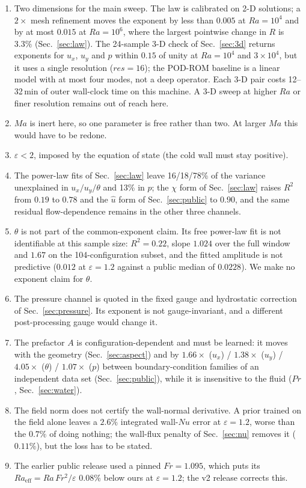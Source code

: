 \documentclass[preprint,11pt,a4paper,times,doubleblind]{elsarticle}
\begin{document}
\begin{enumerate}
\item Two dimensions for the main sweep. The law is calibrated on 2-D solutions; a $2\times$ mesh
refinement moves the exponent by less than $0.005$ at $Ra=10^4$ and by at most $0.015$ at
$Ra=10^6$, where the largest pointwise change in $R$ is $3.3\%$ (Sec.~\ref{sec:law}). The 24-sample
3-D check of Sec.~\ref{sec:3d} returns exponents for $u_x$, $u_y$ and $p$ within $0.15$ of unity
at $Ra=10^4$ and $3\times10^4$, but it uses a single resolution ($res=16$); the
POD-ROM baseline is a linear model with at most four modes, not a deep operator. Each 3-D pair costs
12--32\,min of outer wall-clock time on this machine. A 3-D sweep at higher $Ra$ or finer resolution
remains out of reach here.
\item $Ma$ is inert here, so one parameter is free rather than two. At larger $Ma$ this would
have to be redone.
\item $\varepsilon<2$, imposed by the equation of state (the cold wall must stay positive).
\item The power-law fits of Sec.~\ref{sec:law} leave 16/18/78\% of the variance unexplained in
$u_x/u_y/\theta$ and 13\% in $p$; the $\chi$ form of Sec.~\ref{sec:law} raises $R^2$ from $0.19$ to
$0.78$ and the $\hat u$ form of Sec.~\ref{sec:public} to $0.90$, and the same residual
flow-dependence remains in the other three channels.
\item $\theta$ is not part of the common-exponent claim. Its free power-law fit is not identifiable
at this sample size: $R^2=0.22$, slope $1.024$ over the full window and $1.67$ on the
104-configuration subset, and the fitted amplitude is not predictive ($0.012$ at
$\varepsilon=1.2$ against a public median of $0.0228$). We make no exponent claim for $\theta$.
\item The pressure channel is quoted in the fixed gauge and hydrostatic correction of
Sec.~\ref{sec:pressure}. Its exponent is not gauge-invariant, and a different post-processing
gauge would change it.
\item The prefactor $A$ is configuration-dependent and must be learned: it moves with the geometry
(Sec.~\ref{sec:aspect}) and by $1.66\times$ ($u_x$) / $1.38\times$ ($u_y$) / $4.05\times$
($\theta$) / $1.07\times$ ($p$) between boundary-condition families of an independent data set
(Sec.~\ref{sec:public}), while it is insensitive to the fluid ($Pr$, Sec.~\ref{sec:water}).
\item The field norm does not certify the wall-normal derivative. A prior trained on the
field alone leaves a $2.6\%$ integrated wall-$Nu$ error at $\varepsilon=1.2$, worse than the
$0.7\%$ of doing nothing; the wall-flux penalty of Sec.~\ref{sec:nu} removes it ($0.11\%$), but the
loss has to be stated.
\item The earlier public release used a pinned $Fr=1.095$, which puts its
$Ra_{\mathrm{eff}}=Ra\,Fr^2/\varepsilon$ 0.08\% below ours at $\varepsilon=1.2$; the v2 release
corrects this.
\end{enumerate}
\end{document}
